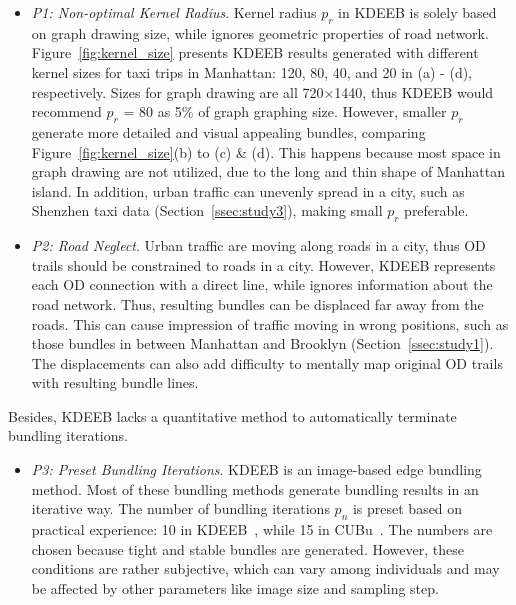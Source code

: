 \begin{itemize}
\item
\textit{P1: Non-optimal Kernel Radius}.
Kernel radius $p_r$ in KDEEB is solely based on graph drawing size, while ignores geometric properties of road network.
Figure~\ref{fig:kernel_size} presents KDEEB results generated with different kernel sizes for taxi trips in Manhattan: 120, 80, 40, and 20 in (a) - (d), respectively.
Sizes for graph drawing are all 720$\times$1440, thus KDEEB would recommend $p_r$ = 80 as 5\% of graph graphing size.
However, smaller $p_r$ generate more detailed and visual appealing bundles, comparing Figure~\ref{fig:kernel_size}(b) to (c) \& (d).
This happens because most space in graph drawing are not utilized, due to the long and thin shape of Manhattan island.
In addition, urban traffic can unevenly spread in a city, such as Shenzhen taxi data (Section~\ref{ssec:study3}), making small $p_r$ preferable.

\vspace{1mm}
\item
\textit{P2: Road Neglect}.
Urban traffic are moving along roads in a city, thus OD trails should be constrained to roads in a city.
However, KDEEB represents each OD connection with a direct line, while ignores information about the road network.
Thus, resulting bundles can be displaced far away from the roads.
This can cause impression of traffic moving in wrong positions, such as those bundles in between Manhattan and Brooklyn (Section~\ref{ssec:study1}).
The displacements can also add difficulty to mentally map original OD trails with resulting bundle lines.
\end{itemize}

\vspace{2mm}
\noindent
Besides, KDEEB lacks a quantitative method to automatically terminate bundling iterations.

\begin{itemize}
\item
\textit{P3: Preset Bundling Iterations}.
KDEEB is an image-based edge bundling method. 
Most of these bundling methods generate bundling results in an iterative way. 
The number of bundling iterations $p_n$ is preset based on practical experience: 10 in KDEEB~\cite{hurter2012graph}, while 15 in CUBu~\cite{van2016cubu}.
The numbers are chosen because tight and stable bundles are generated.
However, these conditions are rather subjective, which can vary among individuals and may be affected by other parameters like image size and sampling step.
\end{itemize}

